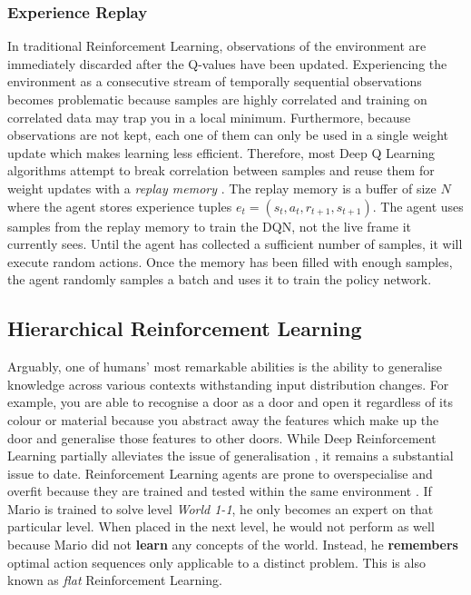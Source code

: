 \documentclass[notitlepage,a4paper,11pt]{article}
\begin{document}

\subsubsection{Experience Replay}
In traditional Reinforcement Learning, observations of the environment are immediately discarded after the Q-values have been updated. Experiencing the environment as a consecutive stream of temporally sequential observations becomes problematic because samples are highly correlated and training on correlated data may trap you in a local minimum. Furthermore, because observations are not kept, each one of them can only be used in a single weight update which makes learning less efficient. Therefore, most Deep Q Learning algorithms attempt to break correlation between samples and reuse them for weight updates with a \textit{replay memory} \cite{lin1993reinforcement}. The replay memory is a buffer of size $N$ where the agent stores experience tuples $e_t = (s_t, a_t, r_{t+1}, s_{t+1})$. The agent uses samples from the replay memory to train the DQN, not the live frame it currently sees. Until the agent has collected a sufficient number of samples, it will execute random actions. Once the memory has been filled with enough samples, the agent randomly samples a batch and uses it to train the policy network. 


\subsection{Hierarchical Reinforcement Learning}
Arguably, one of humans' most remarkable abilities is the ability to generalise knowledge \cite{geirhos2018generalisation} across various contexts withstanding input distribution changes. For example, you are able to recognise a door as a door and open it regardless of its colour or material because you abstract away the features which make up the door and generalise those features to other doors. While Deep Reinforcement Learning partially alleviates the issue of generalisation \cite{sutton1996generalization}, it remains a substantial issue \cite{van2017hybrid} to date. Reinforcement Learning agents are prone to overspecialise and overfit because they are trained and tested within the same environment \cite{cobbe2018quantifying}. If Mario is trained to solve level \textit{World 1-1}, he only becomes an expert on that particular level. When placed in the next level, he would not perform as well because Mario did not \textbf{learn} any concepts of the world. Instead, he \textbf{remembers} optimal action sequences only applicable to a distinct problem. This is also known as \textit{flat} Reinforcement Learning.
\end{document}
